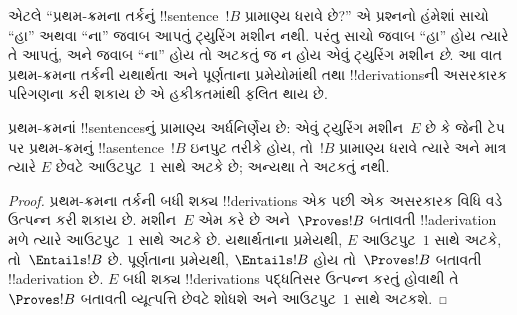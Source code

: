 \documentclass[../../../include/open-logic-section]{subfiles}
\begin{document}
\begin{explain}
એટલે ``પ્રથમ-ક્રમના તર્કનું !!{sentence}~$!B$
પ્રામાણ્ય ધરાવે છે?'' એ પ્રશ્નનો હંમેશાં સાચો ``હા'' અથવા ``ના''
જવાબ આપતું ટ્યુરિંગ મશીન નથી. પરંતુ સાચો જવાબ
``હા'' હોય ત્યારે તે આપતું, અને જવાબ ``ના'' હોય તો
અટકતું જ ન હોય એવું ટ્યુરિંગ મશીન \emph{છે}.
આ વાત પ્રથમ-ક્રમના તર્કની યથાર્થતા અને પૂર્ણતાના
પ્રમેયોમાંથી તથા !!{derivation}sની અસરકારક પરિગણના
કરી શકાય છે એ હકીકતમાંથી ફલિત થાય છે.
\end{explain}

\begin{thm}
  પ્રથમ-ક્રમનાં !!{sentence}sનું પ્રામાણ્ય અર્ધનિર્ણેય
  છે: એવું ટ્યુરિંગ મશીન~$E$ છે કે જેની ટેપ પર
  પ્રથમ-ક્રમનું !!a{sentence}~$!B$ ઇનપુટ તરીકે હોય,
  તો~$!B$ પ્રામાણ્ય ધરાવે ત્યારે અને માત્ર ત્યારે
  $E$ છેવટે આઉટપુટ~$1$ સાથે અટકે છે; અન્યથા તે
  અટકતું નથી.
\end{thm}

\begin{proof}
  પ્રથમ-ક્રમના તર્કની બધી શક્ય !!{derivation}s એક
  પછી એક અસરકારક વિધિ વડે ઉત્પન્ન કરી શકાય છે.
  મશીન~$E$ એમ કરે છે અને~$\Proves !B$ બતાવતી
  !!a{derivation} મળે ત્યારે આઉટપુટ~$1$ સાથે અટકે છે.
  યથાર્થતાના પ્રમેયથી, $E$ આઉટપુટ~$1$ સાથે અટકે,
  તો~$\Entails !B$ છે. પૂર્ણતાના પ્રમેયથી,
  $\Entails !B$ હોય તો~$\Proves !B$ બતાવતી
  !!a{derivation} છે. $E$ બધી શક્ય !!{derivation}s
  પદ્ધતિસર ઉત્પન્ન કરતું હોવાથી તે
  $\Proves !B$ બતાવતી વ્યૂત્પત્તિ છેવટે
  શોધશે અને આઉટપુટ~$1$
  સાથે અટકશે.
\end{proof}
\end{document}
